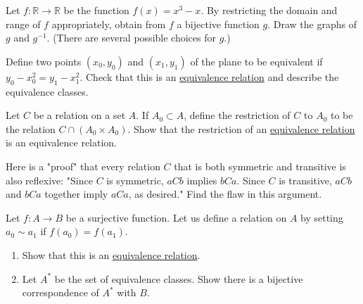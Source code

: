   \begin{exercise}[Munkres 2.6]
    Let $f: \mathbb{R} \to \mathbb{R}$ be the function $f(x) = x^3 - x$. By restricting the domain and range of $f$ appropriately, obtain from $f$ a bijective function $g$. Draw the graphs of $g$ and $g^{-1}$. (There are several possible choices for $g$.)
  \end{exercise}
  \begin{solution}
    
  \end{solution}

  \begin{exercise}[Munkres 3.1]
    Define two points $(x_0, y_0)$ and $(x_1, y_1)$ of the plane to be equivalent if $y_0 - x_0^2 = y_1 - x_1^2$. Check that this is an \hyperref[def:equivalence_relation]{equivalence relation} and describe the equivalence classes.
  \end{exercise}
  \begin{solution}
    
  \end{solution}

  \begin{exercise}[Munkres 3.2]
    Let $C$ be a relation on a set $A$. If $A_0 \subset A$, define the restriction of $C$ to $A_0$ to be the relation $C \cap (A_0 \times A_0)$. Show that the restriction of an \hyperref[def:equivalence_relation]{equivalence relation} is an equivalence relation.
  \end{exercise}
  \begin{solution}
    
  \end{solution}

  \begin{exercise}[Munkres 3.3]
    Here is a "proof" that every relation $C$ that is both symmetric and transitive is also reflexive: "Since $C$ is symmetric, $aCb$ implies $bCa$. Since $C$ is transitive, $aCb$ and $bCa$ together imply $aCa$, as desired." Find the flaw in this argument.
  \end{exercise}
  \begin{solution}
    
  \end{solution}

  \begin{exercise}[Munkres 3.4]
    Let $f: A \to B$ be a surjective function. Let us define a relation on $A$ by setting $a_0 \sim a_1$ if $f(a_0) = f(a_1)$.
    \begin{enumerate}
      \item Show that this is an \hyperref[def:equivalence_relation]{equivalence relation}.
      \item Let $A^*$ be the set of equivalence classes. Show there is a bijective correspondence of $A^*$ with $B$.
    \end{enumerate}
  \end{exercise}
  \begin{solution}
    
  \end{solution}

